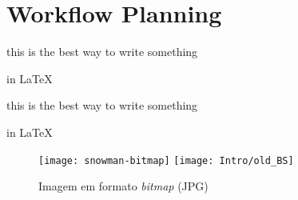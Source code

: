 

\chapter{Workflow Planning}\label{cha:III_workflow}

this is the best way
to write something

in LaTeX


this is the best way
to write something

in LaTeX

\begin{figure}[htbp]
	\centering
	\texttt{[image: snowman-bitmap]}
	\hfill
	\texttt{[image: Intro/old\_BS]}
	\caption{Imagem em formato \emph{bitmap} (JPG)}
	\label{fig:Figuras_Tree_silhouettes-bitmap}
\end{figure}

 
